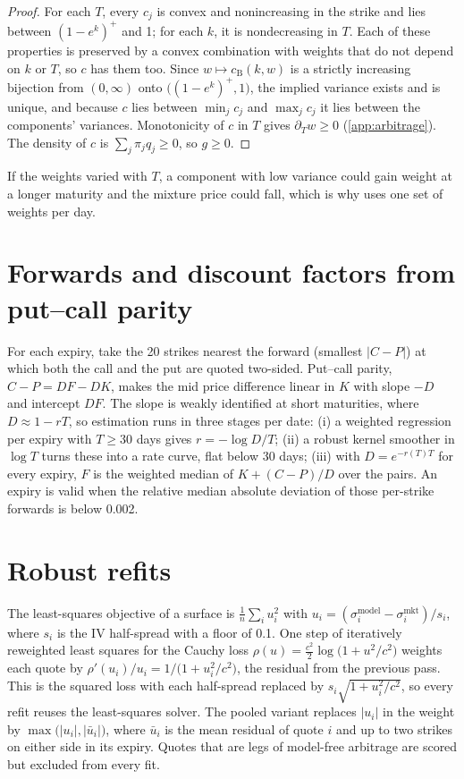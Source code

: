 \begin{proof}
For each $T$, every $c_j$ is convex and nonincreasing in the strike and lies between
$(1-e^k)^+$ and 1; for each $k$, it is nondecreasing in $T$. Each of these properties is preserved
by a convex combination with weights that do not depend on $k$ or $T$, so $c$ has them too. Since
$w\mapsto c_{\text{B}}(k,w)$ is a strictly increasing bijection from $(0,\infty)$ onto
$\bigl((1-e^k)^+,1\bigr)$, the implied variance exists and is unique, and because $c$ lies between
$\min_j c_j$ and $\max_j c_j$ it lies between the components' variances. Monotonicity of $c$ in $T$
gives $\partial_Tw\ge0$ (\cref{app:arbitrage}). The density of $c$ is $\sum_j\pi_jq_j\ge0$, so
$g\ge0$.
\end{proof}

If the weights varied with $T$, a component with low variance could gain weight at a longer maturity
and the mixture price could fall, which is why \mixfour{} uses one set of weights per day.

\section{Forwards and discount factors from put--call parity}
\label{app:forwards}

For each expiry, take the 20 strikes nearest the forward (smallest $|C-P|$) at which both the call
and the put are quoted two-sided. Put--call parity, $C-P=DF-DK$, makes the mid price difference
linear in $K$ with slope $-D$ and intercept $DF$. The slope is weakly identified at short maturities,
where $D\approx1-rT$, so estimation runs in three stages per date: (i) a weighted regression per
expiry with $T\ge30$ days gives $r=-\log D/T$; (ii) a robust kernel smoother in $\log T$ turns these
into a rate curve, flat below 30 days; (iii) with $D=e^{-r(T)T}$ for every expiry, $F$ is the
weighted median of $K+(C-P)/D$ over the pairs. An expiry is valid when the relative median absolute
deviation of those per-strike forwards is below 0.002.

\section{Robust refits}
\label{app:robust}

The least-squares objective of a surface is $\frac1n\sum_i u_i^2$ with
$u_i=(\sigma^{\text{model}}_i-\sigma^{\text{mkt}}_i)/s_i$, where $s_i$ is the IV half-spread with a floor
of 0.1\vp. One step of iteratively reweighted least squares for the Cauchy loss
$\rho(u)=\tfrac{c^2}{2}\log\bigl(1+u^2/c^2\bigr)$ weights each quote by
$\rho'(u_i)/u_i=1/\bigl(1+u_i^2/c^2\bigr)$, the residual from the previous pass. This is the squared
loss with each half-spread replaced by $s_i\sqrt{1+u_i^2/c^2}$, so every refit reuses the
least-squares solver. The pooled variant replaces $|u_i|$ in the weight by
$\max\bigl(|u_i|,|\bar u_i|\bigr)$, where $\bar u_i$ is the mean residual of quote $i$ and up to two
strikes on either side in its expiry. Quotes that are legs of model-free arbitrage are scored but
excluded from every fit.


